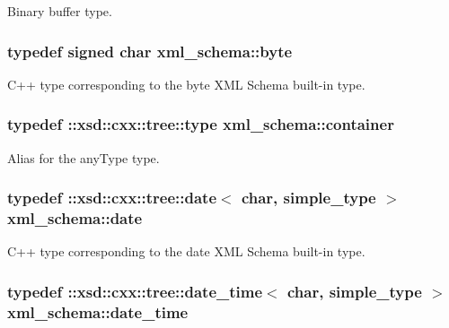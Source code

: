 Binary buffer type. 

\hypertarget{namespacexml__schema_a2a462724b41fb68016d13b34f9a84b7d}{
\subsubsection[{byte}]{\setlength{\rightskip}{0pt plus 5cm}typedef signed char {\bf xml\+\_\+schema\+::byte}}}\label{namespacexml__schema_a2a462724b41fb68016d13b34f9a84b7d}


C++ type corresponding to the byte X\+M\+L Schema built-\/in type. 

\hypertarget{namespacexml__schema_a395f5179c5fc4643909d66e9ff28d8ca}{
\subsubsection[{container}]{\setlength{\rightskip}{0pt plus 5cm}typedef \+::xsd\+::cxx\+::tree\+::type {\bf xml\+\_\+schema\+::container}}}\label{namespacexml__schema_a395f5179c5fc4643909d66e9ff28d8ca}


Alias for the any\+Type type. 

\hypertarget{namespacexml__schema_ad715e8c0fbf8ec80f67de561627f11bf}{
\subsubsection[{date}]{\setlength{\rightskip}{0pt plus 5cm}typedef \+::xsd\+::cxx\+::tree\+::date$<$ char, {\bf simple\+\_\+type} $>$ {\bf xml\+\_\+schema\+::date}}}\label{namespacexml__schema_ad715e8c0fbf8ec80f67de561627f11bf}


C++ type corresponding to the date X\+M\+L Schema built-\/in type. 

\hypertarget{namespacexml__schema_a4e3e937826b835b568d6a97bdaaf0804}{
\subsubsection[{date\+\_\+time}]{\setlength{\rightskip}{0pt plus 5cm}typedef \+::xsd\+::cxx\+::tree\+::date\+\_\+time$<$ char, {\bf simple\+\_\+type} $>$ {\bf xml\+\_\+schema\+::date\+\_\+time}}}\label{namespacexml__schema_a4e3e937826b835b568d6a97bdaaf0804}


